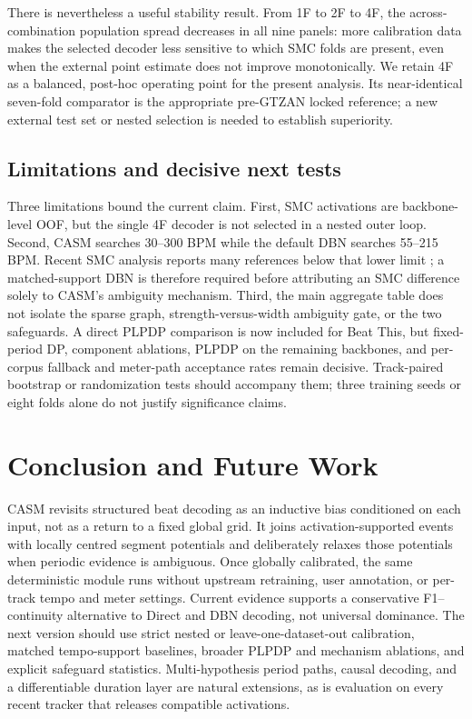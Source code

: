 \documentclass{article}
\begin{document}
There is nevertheless a useful stability result. From 1F to 2F to 4F, the
across-combination population spread decreases in all nine panels: more
calibration data makes the selected decoder less sensitive to which SMC folds
are present, even when the external point estimate does not improve
monotonically. We retain 4F as a balanced, post-hoc operating point for the
present analysis. Its near-identical seven-fold comparator is the appropriate
pre-GTZAN locked reference; a new external test set or nested selection is
needed to establish superiority.

\subsection{Limitations and decisive next tests}

Three limitations bound the current claim. First, SMC activations are
backbone-level OOF, but the single 4F decoder is not selected in a nested outer
loop. Second, CASM searches 30--300 BPM while the default DBN searches
55--215 BPM. Recent SMC analysis reports many references below that lower
limit \cite{ahn2026smcblindspot}; a matched-support DBN is therefore required
before attributing an SMC difference solely to CASM's ambiguity mechanism.
Third, the main aggregate table does not isolate the sparse graph,
strength-versus-width ambiguity gate, or the two safeguards. A direct PLPDP
comparison is now included for Beat This, but fixed-period DP, component
ablations, PLPDP on the remaining backbones, and per-corpus fallback and
meter-path acceptance rates remain decisive. Track-paired
bootstrap or randomization tests should accompany them; three training seeds
or eight folds alone do not justify significance claims.

\section{Conclusion and Future Work}
\label{sec:concl}

CASM revisits structured beat decoding as an inductive bias conditioned on each
input, not as a return to a fixed global grid. It joins activation-supported events
with locally centred segment potentials and deliberately relaxes those
potentials when periodic evidence is ambiguous. Once globally calibrated,
the same deterministic module runs without upstream retraining, user
annotation, or per-track tempo and meter settings. Current evidence supports
a conservative F1--continuity alternative to Direct and DBN decoding, not
universal dominance. The next version should use strict nested or
leave-one-dataset-out calibration, matched tempo-support baselines, broader
PLPDP and mechanism ablations, and explicit safeguard statistics. Multi-hypothesis
period paths, causal decoding, and a differentiable duration layer are natural
extensions, as is evaluation on every recent tracker that releases compatible
activations.



\end{document}
